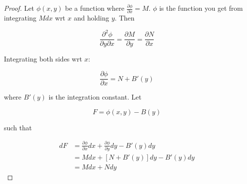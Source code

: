 \begin{proof}
    Let $\phi(x,y)$ be a function where $\frac{\partial \phi}{\partial x}=M$. $\phi$ is the function you get from integrating $Mdx$ wrt $x$ and holding $y$. Then

    \begin{equation*}
        \frac{\partial^2\phi}{\partial y\partial x}=\frac{\partial M}{\partial y}=\frac{\partial N}{\partial x}
    \end{equation*}

    Integrating both sides wrt $x$:

    \begin{equation*}
        \frac{\partial \phi}{\partial x}=N+B'(y)
    \end{equation*}

    where $B'(y)$ is the integration constant. Let

    \begin{equation*}
        F=\phi(x,y)-B(y)
    \end{equation*}

    such that 

    \begin{align*}
        dF&=\frac{\partial \phi}{\partial x}dx+\frac{\partial \phi}{\partial y}dy-B'(y)dy\\
        &=Mdx+\left[N+B'(y)\right]dy-B'(y)dy\\
        &=Mdx+Ndy
    \end{align*}
\end{proof}

